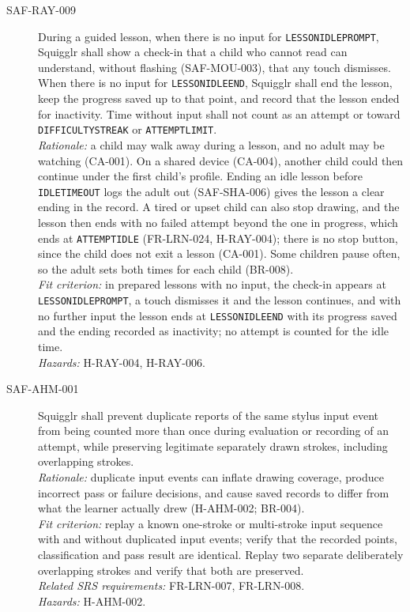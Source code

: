 \documentclass[12pt]{article}
\renewcommand{\_}{\textunderscore\allowbreak}%
\begin{document}
\begin{description}
\item[SAF-RAY-009]\label{req:SAF-RAY-009} During a guided
lesson, when there is no input for \texttt{LESSON\_IDLE\_PROMPT}, Squigglr shall
show a check-in that a child who cannot read can understand, without flashing
(SAF-MOU-003), that any touch dismisses. When there is no input for
\texttt{LESSON\_IDLE\_END}, Squigglr shall end the lesson, keep the progress
saved up to that point, and record that the lesson ended for inactivity. Time
without input shall not count as an attempt or toward
\texttt{DIFFICULTY\_STREAK} or \texttt{ATTEMPT\_LIMIT}.\\
\emph{Rationale:} a child may walk away during a lesson, and no adult may be
watching (CA-001). On a shared device (CA-004), another child could then
continue under the first child's profile. Ending an idle lesson before
\texttt{IDLE\_TIMEOUT} logs the adult out (SAF-SHA-006) gives the lesson a
clear ending in the record. A tired or upset child can also stop drawing, and
the lesson then ends with no failed attempt beyond the one in progress, which
ends at \texttt{ATTEMPT\_IDLE} (FR-LRN-024, H-RAY-004); there is no stop
button, since the child does not exit a lesson (CA-001). Some children pause
often, so the adult sets both times for each child (BR-008).\\
\emph{Fit criterion:} in prepared lessons with no input, the check-in appears at
\texttt{LESSON\_IDLE\_PROMPT}, a touch dismisses it and the lesson continues,
and with no further input the lesson ends at \texttt{LESSON\_IDLE\_END} with
its progress saved and the ending recorded as inactivity; no attempt is counted
for the idle time.\\
\emph{Hazards:} H-RAY-004, H-RAY-006.

\item[SAF-AHM-001]\label{req:SAF-AHM-001} Squigglr shall prevent
duplicate reports of the same stylus input event from being counted more than
once during evaluation or recording of an attempt, while preserving legitimate
separately drawn strokes, including overlapping strokes.\\
\emph{Rationale:} duplicate input events can inflate drawing coverage, produce
incorrect pass or failure decisions, and cause saved records to differ from what
the learner actually drew (H-AHM-002; BR-004).\\
\emph{Fit criterion:} replay a known one-stroke or multi-stroke input sequence
with and without duplicated input events; verify that the recorded points,
classification and pass result are identical. Replay two separate deliberately
overlapping strokes and verify that both are preserved.\\
\emph{Related SRS requirements:} FR-LRN-007, FR-LRN-008.\\
\emph{Hazards:} H-AHM-002.


\end{description}
\end{document}
